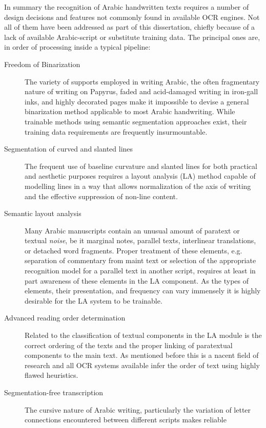 In summary the recognition of Arabic handwritten texts requires a number of
design decisions and features not commonly found in available OCR engines. Not
all of them have been addressed as part of this dissertation, chiefly because
of a lack of available Arabic-script or substitute training data. The principal
ones are, in order of processing inside a typical pipeline:

\begin{description}
	\item[Freedom of Binarization] The variety of supports employed in
		writing Arabic, the often fragmentary nature of writing on
		Papyrus, faded and acid-damaged writing in iron-gall inks, and
		highly decorated pages make it impossible to devise a general
		binarization method applicable to most Arabic handwriting.
		While trainable methods using semantic segmentation approaches
		exist, their training data requirements are frequently
		insurmountable.
	\item[Segmentation of curved and slanted lines] The frequent use of
		baseline curvature and slanted lines for both practical and
		aesthetic purposes requires a layout analysis (LA) method
		capable of modelling lines in a way that allows normalization
		of the axis of writing and the effective suppression of
		non-line content.
	\item[Semantic layout analysis] Many Arabic manuscripts contain an
		unusual amount of paratext or textual \emph{noise}, be it
		marginal notes, parallel texts, interlinear translations, or
		detached word fragments. Proper treatment of these elements,
		e.g. separation of commentary from maint text or selection of
		the appropriate recognition model for a parallel text in
		another script, requires at least in part awareness of these
		elements in the LA component. As the types of elements, their
		presentation, and frequency can vary immensely it is highly
		desirable for the LA system to be trainable.
	\item[Advanced reading order determination] Related to the
		classification of textual components in the LA module is the
		correct ordering of the texts and the proper linking of
		paratextual components to the main text. As mentioned before
		this is a nacent field of research and all OCR systems
		available infer the order of text using highly flawed
		heuristics.
	\item[Segmentation-free transcription] The cursive nature of Arabic
		writing, particularly the variation of letter connections
		encountered between different scripts makes reliable

\end{description}
